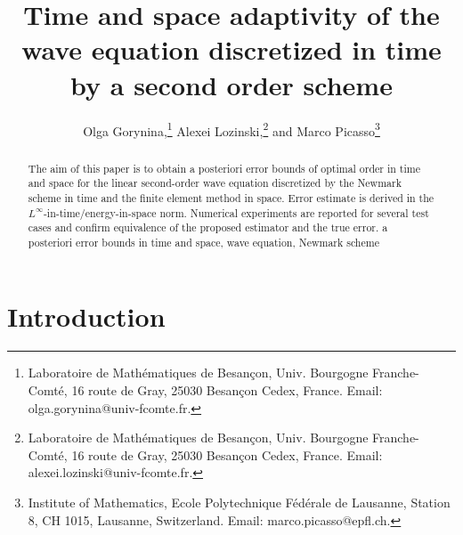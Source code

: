 \documentclass{imanum}
\begin{document}
\title{Time and space adaptivity of the wave equation discretized in time by a second order scheme} 


\author{
  Olga Gorynina,\thanks{Laboratoire de Math\'{e}matiques de Besan\c{c}on, Univ. Bourgogne Franche-Comt\'{e}, 16 route de Gray, 25030 Besan\c{c}on Cedex, France. Email: olga.gorynina@univ-fcomte.fr.}
  Alexei Lozinski,\thanks{Laboratoire de Math\'{e}matiques de Besan\c{c}on, Univ. Bourgogne Franche-Comt\'{e}, 16 route de Gray, 25030 Besan\c{c}on Cedex, France. Email: alexei.lozinski@univ-fcomte.fr.}
  and
  Marco Picasso\thanks{Institute of Mathematics, Ecole Polytechnique F\'{e}d\'{e}rale de Lausanne, Station 8, CH 1015, Lausanne, Switzerland. Email: marco.picasso@epfl.ch.}
}


\maketitle

\begin{abstract}
{
The aim of this paper is to obtain a posteriori error bounds of optimal order in time and space for the linear second-order wave equation discretized by the Newmark scheme in time and the  finite element method in space. Error estimate is derived in the $L^{\infty}$-in-time/energy-in-space norm. Numerical experiments are reported for several test cases and confirm equivalence of the proposed estimator and the true error.
}
{  
a posteriori error bounds in time and space, wave equation, Newmark scheme
}
\end{abstract}

\section{Introduction}
\end{document}
